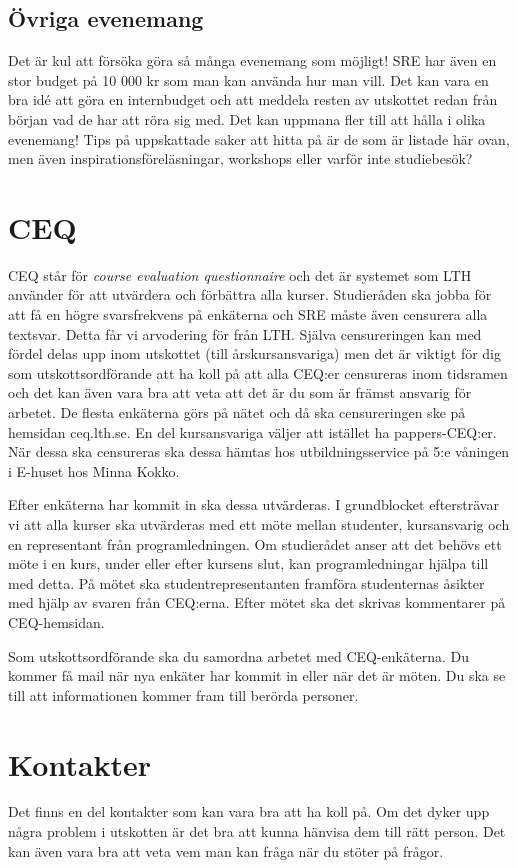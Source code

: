 \documentclass[10pt]{article}
\begin{document}
\subsection{Övriga evenemang}
Det är kul att försöka göra så många evenemang som möjligt! SRE har även en stor budget på 10 000 kr som man kan använda hur man vill. Det kan vara en bra idé att göra en internbudget och att meddela resten av utskottet redan från början vad de har att röra sig med. Det kan uppmana fler till att hålla i olika evenemang! Tips på uppskattade saker att hitta på är de som är listade här ovan, men även inspirationsföreläsningar, workshops eller varför inte studiebesök?

\section{CEQ}

CEQ står för \textit{course evaluation questionnaire} och det är systemet som LTH använder för att utvärdera och förbättra alla kurser. Studieråden ska jobba för att få en högre svarsfrekvens på enkäterna och SRE måste även censurera alla textsvar. Detta får vi arvodering för från LTH. Själva censureringen kan med fördel delas upp inom utskottet (till årskursansvariga) men det är viktigt för dig som utskottsordförande att ha koll på att alla CEQ:er censureras inom tidsramen och det kan även vara bra att veta att det är du som är främst ansvarig för arbetet. De flesta enkäterna görs på nätet och då ska censureringen ske på hemsidan ceq.lth.se. En del kursansvariga väljer att istället ha pappers-CEQ:er. När dessa ska censureras ska dessa hämtas hos utbildningsservice på 5:e våningen i E-huset hos Minna Kokko.

Efter enkäterna har kommit in ska dessa utvärderas. I grundblocket eftersträvar vi att alla kurser ska utvärderas med ett möte mellan studenter, kursansvarig och en representant från programledningen. Om studierådet anser att det behövs ett möte i en kurs, under eller efter kursens slut, kan programledningar hjälpa till med detta. På mötet ska studentrepresentanten framföra studenternas åsikter med hjälp av svaren från CEQ:erna. Efter mötet ska det skrivas kommentarer på CEQ-hemsidan.

Som utskottsordförande ska du samordna arbetet med CEQ-enkäterna. Du kommer få mail när nya enkäter har kommit in eller när det är möten. Du ska se till att informationen kommer fram till berörda personer. 

\section{Kontakter}
Det finns en del kontakter som kan vara bra att ha koll på. Om det dyker upp några problem i utskotten är det bra att kunna hänvisa dem till rätt person. Det kan även vara bra att veta vem man kan fråga när du stöter på frågor.
\end{document}
